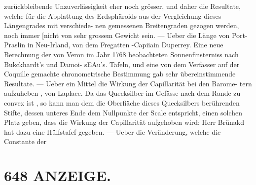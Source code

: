 \documentclass[12pt,a4paper]{article}
\begin{document}
{{{{{{{{zurückbleibende  Unzuverlässigkeit  eher  noch  grösser,  und  daher  die  Resultate, welche  für  die  Abplattung  des  Erdsphäroids  aus  der  Vergleichung  dieses  Längengrades  mit  verschiede- nen gemessenen  Breitengraden  gezogen  werden,  noch  immer  [nicht  von  sehr  grossem  Gewicht  sein.  --- Ueber  die  Länge  von  Port-Praslin  in  Neu-Irland,  von  dem  Fregatten -Capiiain  Duperrey.  Eine  neue Berechnung  der  von  Veron  im  Jahr  1768  beobachteten  Sonnenfinsterniss  nach  Bukckhardt's  und  Damoi- sEAu's.  Tafeln,  und  eine  von  dem  Verfasser  auf  der  Coquille  gemachte  chronometrische  Bestimmung  gab sehr  übereinstimmende  Resultate.  ---  Ueber  ein  Mittel  die  Wirkung  der  Capillarität  bei  den  Barome- tern aufzuheben ,  von  Laplace.  Da  das  Quecksilber  im  Gefässe  nach  dem  Rande  zu  convex  ist ,  so  kann man  dem  die  Oberfiäche  dieses  Quecksilbers  berührenden  Stifte,  dessen  unteres  Ende  dem  Nullpunkte der  Scale  entspricht,  einen  solchen  Platz  geben,  dass  die  Wirkung  der  Capillarität  aufgehoben  wird: Herr  Brünakd  hat  dazu  eine  Hülfstafef  gegeben.  ---     Ueber  die  Veränderung,  welche  die  Constante  der


\section*{648  ANZEIGE.}

}}}}}}}}
\end{document}
